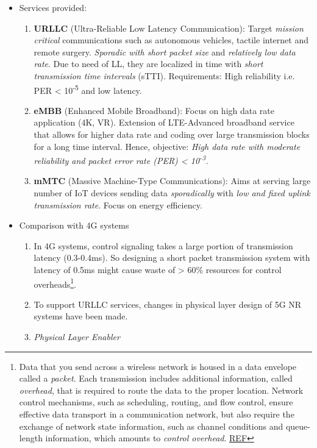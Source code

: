 \documentclass[11pt]{article}
\begin{document}
\begin{itemize}
\item Services provided:
\begin{enumerate}
\item \textbf{URLLC} (Ultra-Reliable Low Latency Communication): Target \emph{mission critical} communications such as autonomous vehicles, tactile internet and remote surgery. \emph{Sporadic with short packet size} and \emph{relatively low data rate}. Due to need of LL, they are localized in time with \emph{short transmission time intervals} (sTTI). Requirements: High reliability i.e. PER < 10\textsuperscript{-5} and low latency.
\item \textbf{eMBB} (Enhanced Mobile Broadband): Focus on high data rate application (4K, VR). Extension of LTE-Advanced broadband service that allows for higher data rate and coding over large transmission blocks for a long time interval. Hence, objective: \emph{High data rate with moderate reliability and packet error rate (PER) < 10\textsuperscript{-3}.}
\item \textbf{mMTC} (Massive Machine-Type Communications): Aims at serving large number of IoT devices sending data \emph{sporadically} with \emph{low and fixed uplink transmission rate}. Focus on energy efficiency.
\end{enumerate}
\item Comparison with 4G systems
\begin{enumerate}
\item In 4G systems, control signaling takes a large portion of transmission latency (0.3-0.4ms). So designing a short packet transmission system with latency of 0.5ms might cause waste of > 60\% resources for control overheads\footnote{Data that you send across a wireless network is housed in a data envelope called a \emph{packet}. Each transmission includes additional information, called \emph{overhead}, that is required to route the data to the proper location. Network control mechanisms, such as scheduling, routing, and flow control, ensure effective data transport in a communication network, but also require the exchange of network state information, such as channel conditions and queue-length information, which amounts to \emph{control overhead}. \href{http://cnrg.mit.edu/protocol-information}{REF}}.
\item To support URLLC services, changes in physical layer design of 5G NR systems have been made.
\item \emph{Physical Layer Enabler}
\end{enumerate}

\end{itemize}
\end{document}
